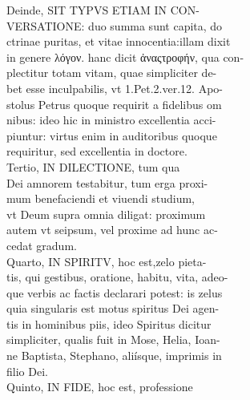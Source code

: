 \documentclass{article}
\begin{document}
\begin{pages}
                Deinde, SIT TYPVS ETIAM IN CON- \\
                VERSATIONE: duo summa sunt capita, do \\
                ctrinae puritas, et vitae innocentia:illam dixit \\
                in genere λόγον. hanc dicit ἀναςτροφήν, qua con- \\
                plectitur totam vitam, quae simpliciter de- \\
                bet esse inculpabilis, vt 1.Pet.2.ver.12. Apo- \\
                stolus Petrus quoque requirit a fidelibus om \\
                nibus: ideo hic in ministro excellentia acci- \\
                piuntur: virtus enim in auditoribus quoque \\
                requiritur, sed excellentia in doctore. \\
                Tertio, IN DILECTIONE, tum qua \\
                Dei amnorem testabitur, tum erga proxi- \\
                mum benefaciendi et viuendi studium, \\
                vt Deum supra omnia diligat: proximum \\
                autem vt seipsum, vel proxime ad hunc ac- \\
                cedat gradum. \\
                Quarto, IN SPIRITV, hoc est,zelo pieta- \\
                tis, qui gestibus, oratione, habitu, vita, adeo- \\
                que verbis ac factis declarari potest: is zelus \\
                quia singularis est motus spiritus Dei agen- \\
                tis in hominibus piis, ideo Spiritus dicitur \\
                simpliciter, qualis fuit in Mose, Helia, Ioan- \\
                ne Baptista, Stephano, aliísque, imprimis in \\
                filio Dei. \\
                Quinto, IN FIDE, hoc est, professione \\

\end{pages}
\end{document}
